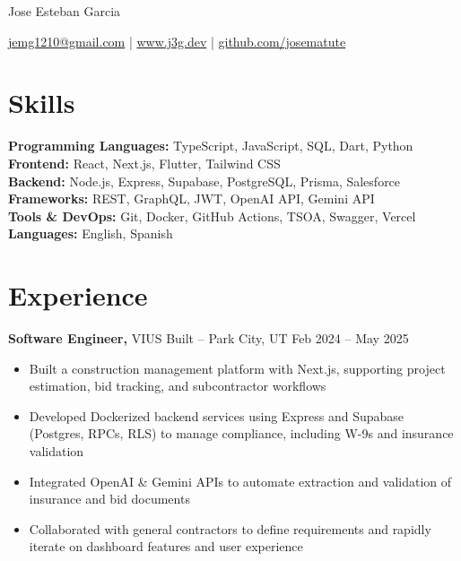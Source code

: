 \documentclass[11pt]{article}       %
\begin{document}
\centerline{\Huge Jose Esteban Garcia}

\vspace{5pt}

\centerline{\href{mailto:jemg1210@gmail.com}{jemg1210@gmail.com} | \href{https://www.j3g.dev}{www.j3g.dev} | \href{https://github.com/josematute}{github.com/josematute}}

\vspace{-10pt}

\section*{Skills}
\textbf{Programming Languages:} TypeScript, JavaScript, SQL, Dart, Python \\
\textbf{Frontend:} React, Next.js, Flutter, Tailwind CSS \\
\textbf{Backend:} Node.js, Express, Supabase, PostgreSQL, Prisma, Salesforce \\
\textbf{Frameworks:} REST, GraphQL, JWT, OpenAI API, Gemini API \\
\textbf{Tools \& DevOps:} Git, Docker, GitHub Actions, TSOA, Swagger, Vercel \\
\textbf{Languages:} English, Spanish

\vspace{-6.5pt}

\section*{Experience}
\textbf{Software Engineer,} VIUS Built -- Park City, UT \hfill Feb 2024 -- May 2025 \\
\vspace{-9pt}
\begin{itemize}
  \item Built a construction management platform with Next.js, supporting project estimation, bid tracking, and subcontractor workflows
  \item Developed Dockerized backend services using Express and Supabase (Postgres, RPCs, RLS) to manage compliance, including W-9s and insurance validation
  \item Integrated OpenAI \& Gemini APIs to automate extraction and validation of insurance and bid documents
  \item Collaborated with general contractors to define requirements and rapidly iterate on dashboard features and user experience
\end{itemize}
\end{document}
